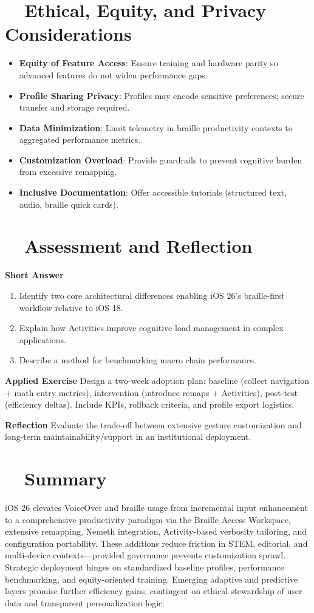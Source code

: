 \section{~~Ethical, Equity, and Privacy Considerations}
\label{sec:sr30-ethics}
\begin{itemize}
	\item \textbf{Equity of Feature Access}: Ensure training and hardware parity so advanced features do not widen performance gaps.
	\item \textbf{Profile Sharing Privacy}: Profiles may encode sensitive preferences; secure transfer and storage required.
	\item \textbf{Data Minimization}: Limit telemetry in braille productivity contexts to aggregated performance metrics.
	\item \textbf{Customization Overload}: Provide guardrails to prevent cognitive burden from excessive remapping.
	\item \textbf{Inclusive Documentation}: Offer accessible tutorials (structured text, audio, braille quick cards).
\end{itemize}

\section{~~Assessment and Reflection}
\label{sec:sr30-assessment}
\textbf{Short Answer}
\begin{enumerate}
	\item Identify two core architectural differences enabling iOS 26’s braille-first workflow relative to iOS 18.
	\item Explain how Activities improve cognitive load management in complex applications.
	\item Describe a method for benchmarking macro chain performance.
\end{enumerate}

\textbf{Applied Exercise} Design a two-week adoption plan: baseline (collect navigation + math entry metrics), intervention (introduce remaps + Activities), post-test (efficiency deltas). Include KPIs, rollback criteria, and profile export logistics.

\textbf{Reflection} Evaluate the trade-off between extensive gesture customization and long-term maintainability/support in an institutional deployment.

\section{~~Summary}
\label{sec:sr30-summary}
iOS 26 elevates VoiceOver and braille usage from incremental input enhancement to a comprehensive productivity paradigm via the Braille Access Workspace, extensive remapping, Nemeth integration, Activity-based verbosity tailoring, and configuration portability. These additions reduce friction in STEM, editorial, and multi-device contexts—provided governance prevents customization sprawl. Strategic deployment hinges on standardized baseline profiles, performance benchmarking, and equity-oriented training. Emerging adaptive and predictive layers promise further efficiency gains, contingent on ethical stewardship of user data and transparent personalization logic.

